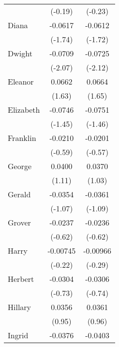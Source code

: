 {\begin{tabular}{l*{2}{c}}
                    &     (-0.19)         &     (-0.23)         \\
[1em]
Diana               &     -0.0617         &     -0.0612         \\
                    &     (-1.74)         &     (-1.72)         \\
[1em]
Dwight              &     -0.0709\sym{*}  &     -0.0725\sym{*}  \\
                    &     (-2.07)         &     (-2.12)         \\
[1em]
Eleanor             &      0.0662         &      0.0664         \\
                    &      (1.63)         &      (1.65)         \\
[1em]
Elizabeth           &     -0.0746         &     -0.0751         \\
                    &     (-1.45)         &     (-1.46)         \\
[1em]
Franklin            &     -0.0210         &     -0.0201         \\
                    &     (-0.59)         &     (-0.57)         \\
[1em]
George              &      0.0400         &      0.0370         \\
                    &      (1.11)         &      (1.03)         \\
[1em]
Gerald              &     -0.0354         &     -0.0361         \\
                    &     (-1.07)         &     (-1.09)         \\
[1em]
Grover              &     -0.0237         &     -0.0236         \\
                    &     (-0.62)         &     (-0.62)         \\
[1em]
Harry               &    -0.00745         &    -0.00966         \\
                    &     (-0.22)         &     (-0.29)         \\
[1em]
Herbert             &     -0.0304         &     -0.0306         \\
                    &     (-0.73)         &     (-0.74)         \\
[1em]
Hillary             &      0.0356         &      0.0361         \\
                    &      (0.95)         &      (0.96)         \\
[1em]
Ingrid              &     -0.0376         &     -0.0403         \\

\end{tabular}}
